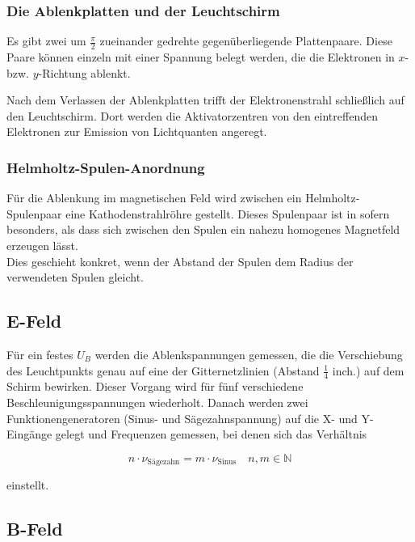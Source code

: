 \subsubsection{Die Ablenkplatten und der Leuchtschirm}

Es gibt zwei um $\frac{\pi}{2}$ zueinander gedrehte gegenüberliegende
Plattenpaare. Diese Paare können einzeln mit einer Spannung belegt
werden, die die Elektronen in $x$- bzw. $y$-Richtung ablenkt.

Nach dem Verlassen der Ablenkplatten trifft der Elektronenstrahl
schließlich auf den Leuchtschirm. Dort werden die Aktivatorzentren von den eintreffenden Elektronen zur Emission von Lichtquanten angeregt.

\subsubsection{Helmholtz-Spulen-Anordnung}

Für die Ablenkung im magnetischen Feld wird zwischen ein Helmholtz-Spulenpaar eine Kathodenstrahlröhre gestellt. Dieses Spulenpaar ist in sofern besonders, als dass sich zwischen den Spulen ein nahezu homogenes Magnetfeld erzeugen lässt.\\
Dies geschieht konkret, wenn der Abstand der Spulen dem Radius der verwendeten Spulen gleicht. \\

\subsection{E-Feld}

Für ein festes $U_B$ werden die Ablenkspannungen gemessen, die die Verschiebung des Leuchtpunkts genau auf eine der Gitternetzlinien (Abstand $\frac{1}{4}$ inch.) auf dem Schirm bewirken. Dieser Vorgang wird für
fünf verschiedene Beschleunigungsspannungen wiederholt.
Danach werden zwei Funktionengeneratoren (Sinus- und Sägezahnspannung) auf die X- und Y-Eingänge gelegt und Frequenzen gemessen, bei denen sich das Verhältnis 

\begin{equation}
\label{eq:Theorie_freqVerhältnis}
n \cdot \nu_\text{Sägezahn} = m \cdot \nu_\text{Sinus} \quad n, m\in\mathbb{N}
\end{equation}

einstellt.

\subsection{B-Feld}

